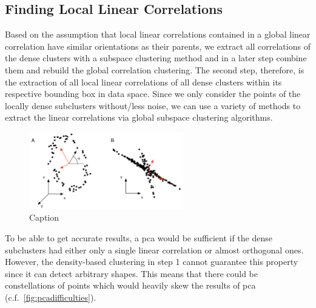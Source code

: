 \subsection{Finding Local Linear Correlations}\label{ssec:findinglocals}
Based on the assumption that local linear correlations contained in a global linear correlation have similar orientations as their parents, we extract all correlations of the dense clusters with a subspace clustering method and in a later step combine them and rebuild the global correlation clustering. The second step, therefore, is the extraction of all local linear correlations of all dense clusters within its respective bounding box in data space. Since we only consider the points of the locally dense subclusters without/less noise, we can use a variety of methods to extract the linear correlations via global subspace clustering algorithms. 

\begin{figure}
    \centering
    \includegraphics[width=0.6\textwidth]{figures/PCAdifficulties.png}
    \caption{Caption\cite{PCAshlens2014tutorial}}
    \label{fig:pcadifficulties}
\end{figure}

To be able to get accurate results, a \gls{pca} would be sufficient if the dense subclusters had either only a single linear correlation or almost orthogonal ones. However, the density-based clustering in step 1 cannot guarantee this property since it can detect arbitrary shapes. This means that there could be constellations of points which would heavily skew the results of \gls{pca} (c.f.~\autoref{fig:pcadifficulties})\cite{PCAshlens2014tutorial}. 

